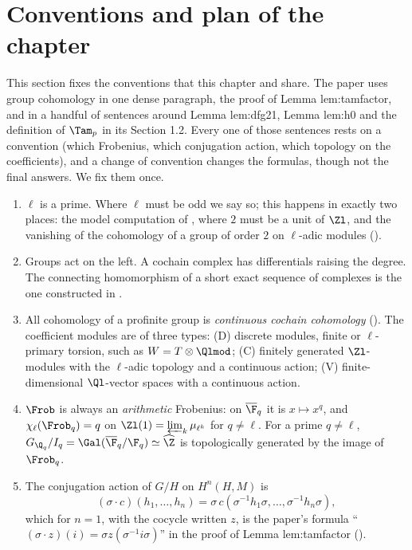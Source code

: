 \section{Conventions and plan of the chapter}\label{sec:cohomology:conventions}

This section fixes the conventions that this chapter and  share. The paper uses group cohomology in one
dense paragraph, the proof of Lemma lem:tamfactor, and in a handful of sentences around Lemma lem:dfg21, Lemma lem:h0 and the
definition of $\Tam_p$ in its Section 1.2. Every one of those sentences rests on a convention (which Frobenius, which conjugation action,
which topology on the coefficients), and a change of convention changes the formulas, though not the final answers. We fix them once.

\begin{convention}\label{conv:cohomology:conventions}
\begin{enumerate}[label=(\alph*)]
\item $\ell$ is a prime. Where $\ell$ must be odd we say so; this happens in exactly two places: the model computation of
, where $2$ must be a unit of $\Zl$, and the vanishing of the cohomology of a group of order $2$ on $\ell$-adic modules
().
\item Groups act on the left. A cochain complex has differentials raising the degree. The connecting homomorphism of a short exact sequence of
complexes is the one constructed in .
\item All cohomology of a profinite group is \emph{continuous cochain cohomology} (). The coefficient modules are of three
types: (D) discrete modules, finite or $\ell$-primary torsion, such as $W=T\otimes\Qlmod$; (C) finitely generated $\Zl$-modules with the $\ell$-adic
topology and a continuous action; (V) finite-dimensional $\Ql$-vector spaces with a continuous action.
\item $\Frob$ is always an \emph{arithmetic} Frobenius: on $\overline\F_q$ it is $x\mapsto x^q$, and $\chi_\ell(\Frob_q)=q$ on $\Zl(1)=\varprojlim_k\mu_{\ell^k}$ for $q\ne\ell$.
For a prime $q\ne\ell$, $G_{\Q_q}/I_q=\Gal(\overline\F_q/\F_q)\simeq\widehat\Z$ is topologically generated by the image of $\Frob_q$.
\item The conjugation action of $G/H$ on $H^n(H,M)$ is
\[
(\sigma\cdot c)(h_1,\dots,h_n)=\sigma\,c(\sigma^{-1}h_1\sigma,\dots,\sigma^{-1}h_n\sigma),
\]
which for $n=1$, with the cocycle written $z$, is the paper's formula ``$(\sigma\cdot z)(i)=\sigma z(\sigma^{-1}i\sigma)$'' in the proof of Lemma lem:tamfactor ().

\end{enumerate}
\end{convention}
